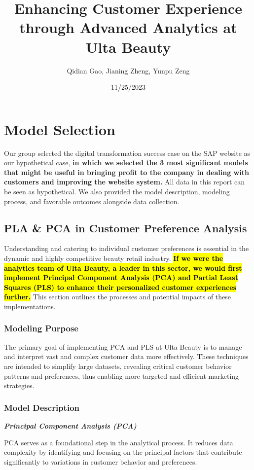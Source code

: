 \documentclass{article}
\title{Enhancing Customer Experience through Advanced Analytics at Ulta Beauty}
\author{Qidian Gao, Jianing Zheng, Yunpu Zeng}
\date{11/25/2023}
\begin{document}
\maketitle

\tableofcontents
\newpage

\section{Model Selection}
Our group selected the digital transformation success case on the SAP website \cite{ultabeauty2021}as our hypothetical case, \textbf{in which we selected the 3 most significant models that might be useful in bringing profit to the company in dealing with customers and improving the website system. }All data in this report can be seen as hypothetical. We also provided the model description, modeling process, and favorable outcomes alongside data collection.
\subsection{PLA \& PCA in Customer Preference Analysis}
\label{sec:enhancing_customer_experience}

Understanding and catering to individual customer preferences is essential in the dynamic and highly competitive beauty retail industry. \textbf{\hl{If we were the analytics team of Ulta Beauty, a leader in this sector, we would first implement Principal Component Analysis (PCA) and Partial Least Squares (PLS) to enhance their personalized customer experiences further.}} This section outlines the processes and potential impacts of these implementations.

\subsubsection{Modeling Purpose}
\label{sec:modeling_purpose}
The primary goal of implementing PCA and PLS at Ulta Beauty is to manage and interpret vast and complex customer data more effectively. These techniques are intended to simplify large datasets, revealing critical customer behavior patterns and preferences, thus enabling more targeted and efficient marketing strategies.

\subsubsection{Model Description}
\label{sec:model_description}
\textit{\textbf{Principal Component Analysis (PCA)}}\par
PCA serves as a foundational step in the analytical process. It reduces data complexity by identifying and focusing on the principal factors that contribute significantly to variations in customer behavior and preferences.
\end{document}
